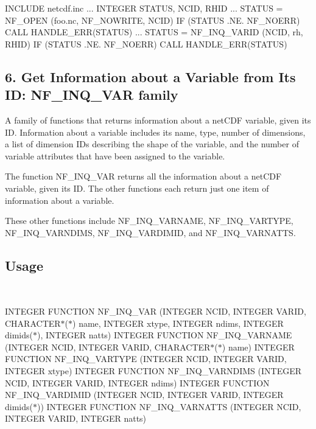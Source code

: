 I\+N\+C\+L\+U\+DE \textquotesingle{}netcdf.\+inc\textquotesingle{} ... I\+N\+T\+E\+G\+ER S\+T\+A\+T\+US, N\+C\+ID, R\+H\+ID ... S\+T\+A\+T\+US = N\+F\+\_\+\+O\+P\+EN (\textquotesingle{}foo.\+nc\textquotesingle{}, N\+F\+\_\+\+N\+O\+W\+R\+I\+TE, N\+C\+ID) IF (S\+T\+A\+T\+US .NE. N\+F\+\_\+\+N\+O\+E\+RR) C\+A\+LL H\+A\+N\+D\+L\+E\+\_\+\+E\+R\+R(\+S\+T\+A\+T\+U\+S) ... S\+T\+A\+T\+US = N\+F\+\_\+\+I\+N\+Q\+\_\+\+V\+A\+R\+ID (N\+C\+ID, \textquotesingle{}rh\textquotesingle{}, R\+H\+ID) IF (S\+T\+A\+T\+US .NE. N\+F\+\_\+\+N\+O\+E\+RR) C\+A\+LL H\+A\+N\+D\+L\+E\+\_\+\+E\+R\+R(\+S\+T\+A\+T\+U\+S)

\subsection*{6. Get Information about a Variable from Its ID\+: N\+F\+\_\+\+I\+N\+Q\+\_\+\+V\+AR family }

A family of functions that returns information about a net\+C\+DF variable, given its ID. Information about a variable includes its name, type, number of dimensions, a list of dimension I\+Ds describing the shape of the variable, and the number of variable attributes that have been assigned to the variable.

The function N\+F\+\_\+\+I\+N\+Q\+\_\+\+V\+AR returns all the information about a net\+C\+DF variable, given its ID. The other functions each return just one item of information about a variable.

These other functions include N\+F\+\_\+\+I\+N\+Q\+\_\+\+V\+A\+R\+N\+A\+ME, N\+F\+\_\+\+I\+N\+Q\+\_\+\+V\+A\+R\+T\+Y\+PE, N\+F\+\_\+\+I\+N\+Q\+\_\+\+V\+A\+R\+N\+D\+I\+MS, N\+F\+\_\+\+I\+N\+Q\+\_\+\+V\+A\+R\+D\+I\+M\+ID, and N\+F\+\_\+\+I\+N\+Q\+\_\+\+V\+A\+R\+N\+A\+T\+TS.

\subsection*{Usage }

 

I\+N\+T\+E\+G\+ER F\+U\+N\+C\+T\+I\+ON N\+F\+\_\+\+I\+N\+Q\+\_\+\+V\+AR (I\+N\+T\+E\+G\+ER N\+C\+ID, I\+N\+T\+E\+G\+ER V\+A\+R\+ID, C\+H\+A\+R\+A\+C\+T\+E\+R$\ast$($\ast$) name, I\+N\+T\+E\+G\+ER xtype, I\+N\+T\+E\+G\+ER ndims, I\+N\+T\+E\+G\+ER dimids($\ast$), I\+N\+T\+E\+G\+ER natts) I\+N\+T\+E\+G\+ER F\+U\+N\+C\+T\+I\+ON N\+F\+\_\+\+I\+N\+Q\+\_\+\+V\+A\+R\+N\+A\+ME (I\+N\+T\+E\+G\+ER N\+C\+ID, I\+N\+T\+E\+G\+ER V\+A\+R\+ID, C\+H\+A\+R\+A\+C\+T\+E\+R$\ast$($\ast$) name) I\+N\+T\+E\+G\+ER F\+U\+N\+C\+T\+I\+ON N\+F\+\_\+\+I\+N\+Q\+\_\+\+V\+A\+R\+T\+Y\+PE (I\+N\+T\+E\+G\+ER N\+C\+ID, I\+N\+T\+E\+G\+ER V\+A\+R\+ID, I\+N\+T\+E\+G\+ER xtype) I\+N\+T\+E\+G\+ER F\+U\+N\+C\+T\+I\+ON N\+F\+\_\+\+I\+N\+Q\+\_\+\+V\+A\+R\+N\+D\+I\+MS (I\+N\+T\+E\+G\+ER N\+C\+ID, I\+N\+T\+E\+G\+ER V\+A\+R\+ID, I\+N\+T\+E\+G\+ER ndims) I\+N\+T\+E\+G\+ER F\+U\+N\+C\+T\+I\+ON N\+F\+\_\+\+I\+N\+Q\+\_\+\+V\+A\+R\+D\+I\+M\+ID (I\+N\+T\+E\+G\+ER N\+C\+ID, I\+N\+T\+E\+G\+ER V\+A\+R\+ID, I\+N\+T\+E\+G\+ER dimids($\ast$)) I\+N\+T\+E\+G\+ER F\+U\+N\+C\+T\+I\+ON N\+F\+\_\+\+I\+N\+Q\+\_\+\+V\+A\+R\+N\+A\+T\+TS (I\+N\+T\+E\+G\+ER N\+C\+ID, I\+N\+T\+E\+G\+ER V\+A\+R\+ID, I\+N\+T\+E\+G\+ER natts)

